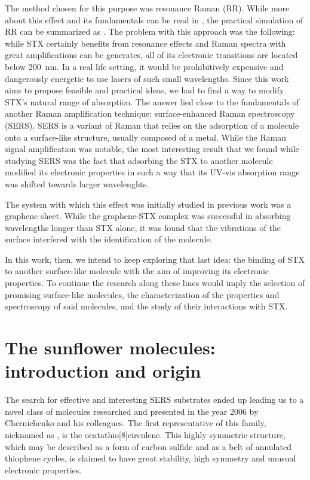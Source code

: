 The method chosen for this purpose was resonance Raman (RR).
While more about this effect and its fundamentals can be read in , the practical simulation of RR can be summarized as .
The problem with this approach was the following: while STX certainly benefits from resonance effects and Raman spectra with great amplifications can be generates, all of its electronic transitions are located below \SI{200}{\nano\metre}.
In a real life setting, it would be prohibitively expensive and dangerously energetic to use lasers of such small wavelengths.
Since this work aims to propose feasible and practical ideas, we had to find a way to modify STX's natural range of absorption.
The answer lied close to the fundamentals of another Raman amplification technique: surface-enhanced Raman spectroscopy (SERS).
SERS is a variant of Raman that relies on the adsorption of a molecule onto a surface-like structure, usually composed of a metal.
While the Raman signal amplification was notable, the most interesting result that we found while studying SERS was the fact that adsorbing the STX to another molecule modified its electronic properties in such a way that its UV-vis absorption range was shifted towards larger wavelenghts.

The system with which this effect was initially studied in previous work was a graphene sheet.
While the graphene-STX complex was successful in absorbing wavelengths longer than STX alone, it was found that the vibrations of the surface interfered with the identification of the molecule.

In this work, then, we intend to keep exploring that last idea: the binding of STX to another surface-like molecule with the aim of improving its electronic properties.
To continue the research along these lines would imply the selection of promising surface-like molecules, the characterization of the properties and spectroscopy of said molecules, and the study of their interactions with STX.


\section{The sunflower molecules: introduction and origin}

The search for effective and interesting SERS substrates ended up leading us to a novel class of molecules researched and presented in the year 2006 by Chernichenko and his colleagues.
The first representative of this family, nicknamed as , is the ocatathio[8]circulene.
This highly symmetric structure, which may be described as a form of carbon sulfide and as a belt of annulated thiophene cycles, is claimed to have great stability, high symmetry and unusual electronic properties.

